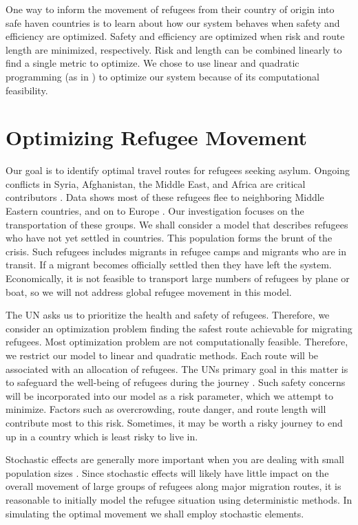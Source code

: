 \documentclass{article}
\begin{document}
One way to inform the movement of refugees from their country of origin into safe haven countries is to learn about how our system behaves when safety and efficiency are optimized. Safety and efficiency are optimized when risk and route length are minimized, respectively. Risk and length can be combined linearly to find a single metric to optimize. We chose to use linear and quadratic programming (as in \cite{bertsekas}) to optimize our system because of its computational feasibility.

\section{Optimizing Refugee Movement}

Our goal is to identify optimal travel routes for refugees seeking asylum. Ongoing conflicts in Syria, Afghanistan, the Middle East, and Africa are critical contributors \cite{refugeefactsheet}. Data shows most of these refugees flee to neighboring Middle Eastern countries, and on to Europe \cite{refugeefactsheet}. Our investigation focuses on the transportation of these groups. We shall consider a model that describes refugees who have not yet settled in countries. This population forms the brunt of the crisis. Such refugees includes migrants in refugee camps and migrants who are in transit. If a migrant becomes officially settled then they have left the system. Economically, it is not feasible to transport large numbers of refugees by plane or boat, so we will not address global refugee movement in this model.

The UN asks us to prioritize the health and safety of refugees. Therefore, we consider an optimization problem finding the safest route achievable for migrating refugees. Most optimization problem are not computationally feasible. Therefore, we restrict our model to linear and quadratic methods. Each route will be associated with an allocation of refugees. The UNs primary goal in this matter is to safeguard the well-being of refugees during the journey \cite{UNStatement}. Such safety concerns will be incorporated into our model as a risk parameter, which we attempt to minimize. Factors such as overcrowding, route danger, and route length will contribute most to this risk. Sometimes, it may be worth a risky journey to end up in a country which is least risky to live in.

Stochastic effects are generally more important when you are dealing with small population sizes \cite{vries}. Since stochastic effects will likely have little impact on the overall movement of large groups of refugees along major migration routes, it is reasonable to initially model the refugee situation using deterministic methods. In simulating the optimal movement we shall employ stochastic elements.
\end{document}
